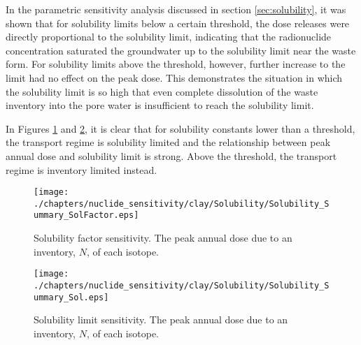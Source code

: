 In the parametric sensitivity analysis discussed in section 
\ref{sec:solubility}, it was shown that for solubility limits below a certain 
threshold, the dose releases were directly proportional to the solubility 
limit, indicating that the radionuclide concentration saturated the groundwater 
up to the solubility limit near the waste form.  For solubility limits above 
the threshold, however, further increase to the limit had no effect on the peak 
dose. This demonstrates the situation in which the solubility limit is so high 
that even complete dissolution of the waste inventory into the pore water is 
insufficient to reach the solubility limit.

In Figures \ref{fig:SolSumFactor} and \ref{fig:SolSum}, it is clear that for 
solubility constants lower than a threshold, the transport regime is solubility 
limited and the relationship between peak annual dose and solubility limit is 
strong.  Above the threshold, the transport regime is inventory limited 
instead.  

\begin{figure}[ht]
\centering
\texttt{[image: ./chapters/nuclide\_sensitivity/clay/Solubility/Solubility\_Summary\_SolFactor.eps]}
\caption[Solubility factor sensitivity in GDSM Clay model]{Solubility factor sensitivity. The peak annual dose due to an inventory, 
$N$, of each isotope.}
\label{fig:SolSumFactor}
\end{figure}

\begin{figure}[ht]
\centering
\texttt{[image: ./chapters/nuclide\_sensitivity/clay/Solubility/Solubility\_Summary\_Sol.eps]}
\caption[Solubility limit sensitivity in GDSM Clay model]{Solubility limit sensitivity. The peak annual dose due to an inventory, 
$N$, of each isotope.}
\label{fig:SolSum}
\end{figure}
\FloatBarrier
